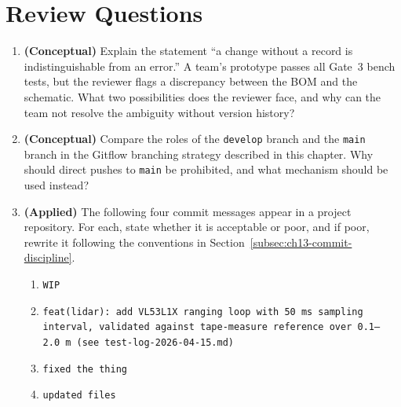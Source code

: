 \section*{Review Questions}
\label{sec:ch13-review}

\begin{enumerate}

  \item \textbf{(Conceptual)} Explain the statement ``a change without a record is
        indistinguishable from an error.''
        A team's prototype passes all Gate~3 bench tests, but the reviewer flags a
        discrepancy between the BOM and the schematic.
        What two possibilities does the reviewer face, and why can the team not resolve the
        ambiguity without version history?

  \item \textbf{(Conceptual)} Compare the roles of the \texttt{develop} branch and the
        \texttt{main} branch in the Gitflow branching strategy described in this chapter.
        Why should direct pushes to \texttt{main} be prohibited, and what mechanism should
        be used instead?

  \item \textbf{(Applied)} The following four commit messages appear in a project
        repository.
        For each, state whether it is acceptable or poor, and if poor, rewrite it following
        the conventions in Section~\ref{subsec:ch13-commit-discipline}.
        \begin{enumerate}
          \item[(a)] \texttt{WIP}
          \item[(b)] \texttt{feat(lidar): add VL53L1X ranging loop with 50~ms sampling interval, validated against tape-measure reference over 0.1--2.0~m (see test-log-2026-04-15.md)}
          \item[(c)] \texttt{fixed the thing}
          \item[(d)] \texttt{updated files}
        \end{enumerate}


\end{enumerate}
